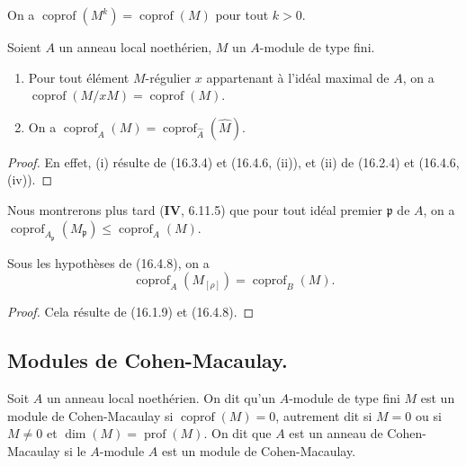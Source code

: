 On a $\operatorname{coprof}(M^k)=\operatorname{coprof}(M)$ pour tout $k>0$.

\begin{proposition}[16.4.10]
\label{0.16.4.10-fr}
Soient $A$ un anneau local noethérien, $M$ un $A$-module de type fini.
\begin{enumerate}
  \item[\textup{(i)}] Pour tout élément $M$-régulier $x$ appartenant à l'idéal maximal
  de $A$, on a
  $\operatorname{coprof}(M/xM)=\operatorname{coprof}(M)$.
  \item[\textup{(ii)}] On a
  $\operatorname{coprof}_A(M)=\operatorname{coprof}_{\widehat A}(\widehat M)$.
\end{enumerate}
\end{proposition}

\begin{proof}
En effet, (i) résulte de (16.3.4) et (16.4.6, (ii)), et (ii) de (16.2.4) et
(16.4.6, (iv)).
\end{proof}

Nous montrerons plus tard (\textbf{IV}, 6.11.5) que pour tout idéal premier
$\mathfrak{p}$ de $A$, on a
$\operatorname{coprof}_{A_{\mathfrak{p}}}(M_{\mathfrak{p}})
\leq\operatorname{coprof}_A(M)$.

\begin{proposition}[16.4.11]
\label{0.16.4.11-fr}
Sous les hypothèses de \textup{(16.4.8)}, on a
\begin{equation}
\label{0.16.4.11.1-fr}
\tag{16.4.11.1}
  \operatorname{coprof}_A(M_{[\rho]})=\operatorname{coprof}_B(M).
\end{equation}
\end{proposition}

\begin{proof}
Cela résulte de (16.1.9) et (16.4.8).
\end{proof}

\subsection{Modules de Cohen-Macaulay.}
\label{subsection:0.16.5-fr}

\begin{definition}[16.5.1]
\label{0.16.5.1-fr}
Soit $A$ un anneau local noethérien. On dit qu'un $A$-module de type fini $M$
est un module de Cohen-Macaulay si
$\operatorname{coprof}(M)=0$, autrement dit si $M=0$ ou si $M\neq0$ et
$\dim(M)=\operatorname{prof}(M)$. On dit que $A$ est un
anneau de Cohen-Macaulay si le $A$-module $A$ est un module de
Cohen-Macaulay.
\end{definition}

